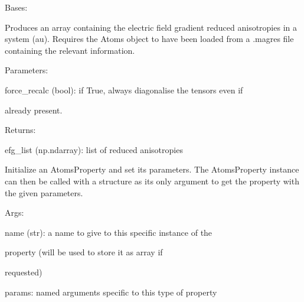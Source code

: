 \documentclass[letterpaper,10pt,english]{sphinxmanual}
\begin{document}
\begin{fulllineitems}
\label{doctree/soprano.properties.nmr.efg:soprano.properties.nmr.efg.EFGReducedAnisotropy}
Bases: {\hyperref[doctree/soprano.properties.atomsproperty:soprano.properties.atomsproperty.AtomsProperty]{\emph{}}}

Produces an array containing the electric field gradient reduced 
anisotropies in a system (au).
Requires the Atoms object to have been loaded from a .magres file
containing the relevant information.

\begin{DUlineblock}{0em}
\item[] Parameters:
\item[]
\begin{DUlineblock}{\DUlineblockindent}
\item[] force\_recalc (bool): if True, always diagonalise the tensors even if
\item[]
\begin{DUlineblock}{\DUlineblockindent}
\item[] already present.
\end{DUlineblock}
\end{DUlineblock}
\end{DUlineblock}

\begin{DUlineblock}{0em}
\item[] Returns:
\item[]
\begin{DUlineblock}{\DUlineblockindent}
\item[] efg\_list (np.ndarray): list of reduced anisotropies
\end{DUlineblock}
\end{DUlineblock}

Initialize an AtomsProperty and set its parameters.
The AtomsProperty instance can then be called with a structure as its
only argument to get the property with the given parameters.

\begin{DUlineblock}{0em}
\item[] Args:
\item[]
\begin{DUlineblock}{\DUlineblockindent}
\item[] name (str): a name to give to this specific instance of the
\item[]
\begin{DUlineblock}{\DUlineblockindent}
\item[] property (will be used to store it as array if
\item[] requested)
\end{DUlineblock}
\item[] params: named arguments specific to this type of property
\end{DUlineblock}
\end{DUlineblock}


\end{fulllineitems}
\end{document}
